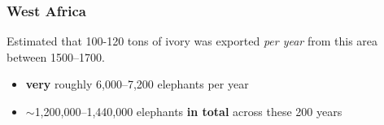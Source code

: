 \documentclass[10pt]{beamer}
\begin{document}
\begin{frame}[t]
\frametitle{West Africa}
\vspace{0.5cm}
	
	Estimated that 100-120 tons of ivory was exported \textcolor{myblue}{\emph{per year}} from this area between 1500--1700.
	\medskip
		\begin{itemize}
			\item \textbf{very} roughly 6,000--7,200 elephants per year
			\medskip
			\item $\sim$1,200,000--1,440,000 elephants \textbf{in total} across these 200 years
		\end{itemize}
	
\end{frame}
\end{document}
